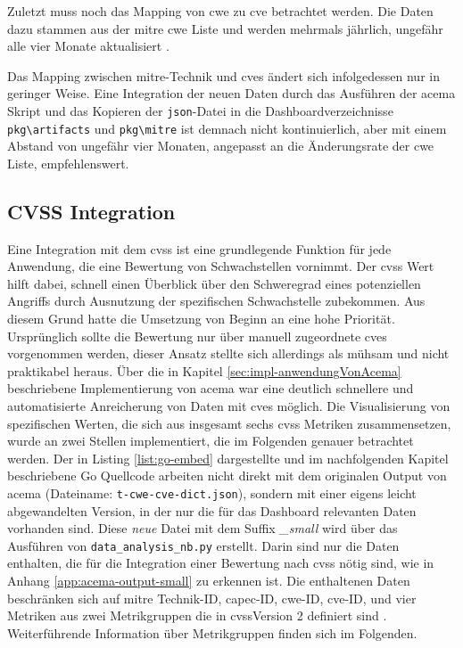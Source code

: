 Zuletzt muss noch das Mapping von \gls{cwe} zu \gls{cve} betrachtet werden. Die Daten dazu stammen aus der \gls{mitre} \gls{cwe} Liste und werden mehrmals jährlich, ungefähr alle vier Monate aktualisiert \autocite{CWEDownloads,AIWorkingGroupMeeting_slides20241115_CWEAIWGpdf2024}.

Das Mapping zwischen \gls{mitre}-Technik und \glspl{cve} ändert sich infolgedessen nur in geringer Weise. Eine Integration der neuen Daten durch das Ausführen der \gls{acema} Skript und das Kopieren der \verb|json|-Datei in die Dashboardverzeichnisse \verb|pkg\artifacts| und \verb|pkg\mitre| ist demnach nicht kontinuierlich, aber mit einem Abstand von ungefähr vier Monaten, angepasst an die Änderungsrate der \gls{cwe} Liste, empfehlenswert.

\subsection{CVSS Integration}
\label{sec:impl-cvssIntegration}
Eine Integration mit dem \gls{cvss} ist eine grundlegende Funktion für jede Anwendung, die eine Bewertung von Schwachstellen vornimmt. Der \gls{cvss} Wert hilft dabei, schnell einen Überblick über den Schweregrad eines potenziellen Angriffs durch Ausnutzung der spezifischen Schwachstelle zubekommen. Aus diesem Grund hatte die Umsetzung von Beginn an eine hohe Priorität. Ursprünglich sollte die Bewertung nur über manuell zugeordnete \glspl{cve} vorgenommen werden, dieser Ansatz stellte sich allerdings als mühsam und nicht praktikabel heraus. Über die in Kapitel \ref{sec:impl-anwendungVonAcema} beschriebene Implementierung von \gls{acema} war eine deutlich schnellere und automatisierte Anreicherung von Daten mit \glspl{cve} möglich. Die Visualisierung von spezifischen Werten, die sich aus insgesamt sechs \gls{cvss} Metriken zusammensetzen, wurde an zwei Stellen implementiert, die im Folgenden genauer betrachtet werden.
Der in Listing \ref{list:go-embed} dargestellte und im nachfolgenden Kapitel beschriebene Go Quellcode arbeiten nicht direkt mit dem originalen Output von \gls{acema} (Dateiname: \verb|t-cwe-cve-dict.json|), sondern mit einer eigens leicht abgewandelten Version, in der nur die für das Dashboard relevanten Daten vorhanden sind. Diese \textit{neue} Datei mit dem Suffix \textit{\_small} wird über das Ausführen von \verb|data_analysis_nb.py| erstellt. Darin sind nur die Daten enthalten, die für die Integration einer Bewertung nach \gls{cvss} nötig sind, wie in Anhang \ref{app:acema-output-small} zu erkennen ist. Die enthaltenen Daten beschränken sich auf \gls{mitre} Technik-ID, \gls{capec}-ID, \gls{cwe}-ID, \gls{cve}-ID, und vier Metriken aus zwei Metrikgruppen die in \gls{cvss}Version 2 definiert sind \autocite{CVSSV2Complete}. Weiterführende Information über Metrikgruppen finden sich im Folgenden.

